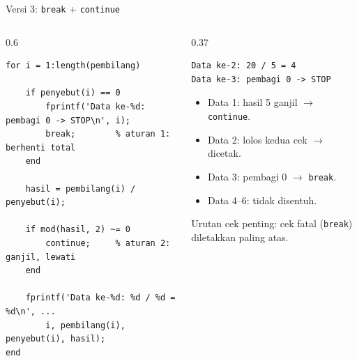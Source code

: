 \documentclass[aspectratio=169,10pt]{beamer}
\newcommand{\codesize}{\footnotesize}
\newcommand{\kode}[1]{\texttt{#1}}
\begin{document}
\begin{frame}[fragile]{Versi 3: \kode{break} + \kode{continue}}
  \renewcommand{\codesize}{\scriptsize}
  \begin{columns}[T]
    \begin{column}{0.6\textwidth}
\begin{lstlisting}
for i = 1:length(pembilang)

    if penyebut(i) == 0
        fprintf('Data ke-%d: pembagi 0 -> STOP\n', i);
        break;        % aturan 1: berhenti total
    end

    hasil = pembilang(i) / penyebut(i);

    if mod(hasil, 2) ~= 0
        continue;     % aturan 2: ganjil, lewati
    end

    fprintf('Data ke-%d: %d / %d = %d\n', ...
        i, pembilang(i), penyebut(i), hasil);
end
\end{lstlisting}
    \end{column}
    \begin{column}{0.37\textwidth}
\begin{lstlisting}[style=out]
Data ke-2: 20 / 5 = 4
Data ke-3: pembagi 0 -> STOP
\end{lstlisting}
      \vspace{4pt}
      \footnotesize
      \begin{itemize}
        \item Data 1: hasil 5 ganjil $\rightarrow$ \kode{continue}.
        \item Data 2: lolos kedua cek $\rightarrow$ dicetak.
        \item Data 3: pembagi 0 $\rightarrow$ \kode{break}.
        \item Data 4--6: tidak disentuh.
      \end{itemize}
      \vspace{2pt}
      \alert{Urutan cek penting}: cek fatal (\kode{break}) diletakkan paling atas.
    \end{column}
  \end{columns}
\end{frame}
\end{document}
